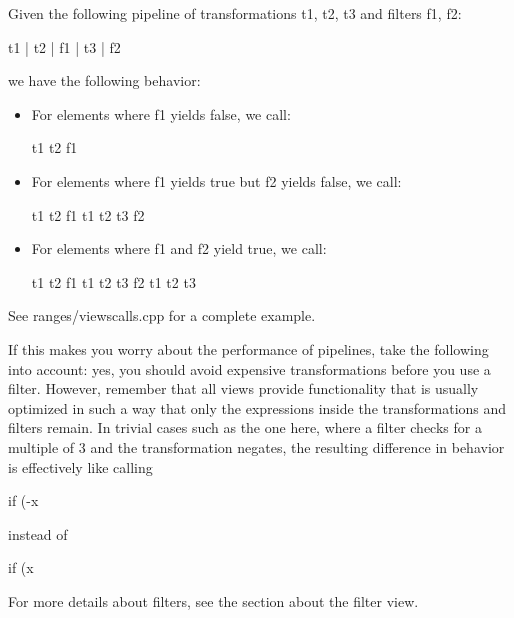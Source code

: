 Given the following pipeline of transformations t1, t2, t3 and filters f1, f2:

\begin{cpp}
t1 | t2 | f1 | t3 | f2
\end{cpp}

we have the following behavior:

\begin{itemize}
\item
For elements where f1 yields false, we call:

\begin{cpp}
t1 t2 f1
\end{cpp}

\item
For elements where f1 yields true but f2 yields false, we call:

\begin{cpp}
t1 t2 f1 t1 t2 t3 f2
\end{cpp}

\item
For elements where f1 and f2 yield true, we call:

\begin{cpp}
t1 t2 f1 t1 t2 t3 f2 t1 t2 t3
\end{cpp}
\end{itemize}

See ranges/viewscalls.cpp for a complete example.

If this makes you worry about the performance of pipelines, take the following into account: yes, you should avoid expensive transformations before you use a filter. However, remember that all views provide functionality that is usually optimized in such a way that only the expressions inside the transformations and filters remain. In trivial cases such as the one here, where a filter checks for a multiple of 3 and the transformation negates, the resulting difference in behavior is effectively like calling

\begin{cpp}
if (-x %
\end{cpp}

instead of

\begin{cpp}
if (x %
\end{cpp}

For more details about filters, see the section about the filter view.
